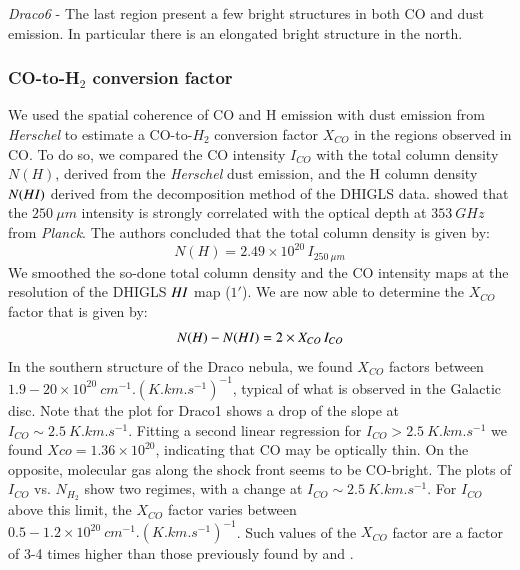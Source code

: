 \documentclass[traditabstract]{aa}
\begin{document}
\noindent \textit{Draco6} - The last region present a few bright structures in both CO and dust emission. In particular there is an elongated bright structure in the north.


      \subsubsection{CO-to-H$_2$ conversion factor}

   We used the spatial coherence of CO and H emission with dust emission from \emph{Herschel} to estimate a CO-to-$H_2$ conversion factor $X_{CO}$ in the regions observed in CO. To do so, we compared the CO intensity $I_{CO}$ with the total column density $N(H)$, derived from the \emph{Herschel} dust emission, and the H column density $N(H\rmnum{1})$ derived from the decomposition method of the DHIGLS data. \cite{MAMD_2017b} showed that the $250\: \mu m$ intensity is strongly correlated with the optical depth at $353\: GHz$ from \emph{Planck}. The authors concluded that the total column density is given by:
\begin{equation}
  N(H)=2.49\times 10^{20}\, I_{250\: \mu m}
\end{equation}
We smoothed the so-done total column density and the CO intensity maps at the resolution of the DHIGLS $H\rmnum{1}$ map ($1'$). We are now able to determine the $X_{CO}$ factor that is given by:
\begin{equation}
  N(H)-N(H\rmnum{1})=2\times X_{CO}\, I_{CO}
\end{equation}
In the southern structure of the Draco nebula, we found $X_{CO}$ factors between $1.9-20\times 10^{20}\: cm^{-1}.(K.km.s^{-1})^{-1}$, typical of what is observed in the Galactic disc\citep{Bolatto_2013}. Note that the plot for Draco1 shows a drop of the slope at $I_{CO}\sim 2.5\: K.km.s^{-1}$. Fitting a second linear regression for $I_{CO}>2.5\: K.km.s^{-1}$ we found $Xco=1.36\times 10^{20}$, indicating that CO may be optically thin.
On the opposite, molecular gas along the shock front seems to be CO-bright. The plots of $I_{CO}$ vs. $N_{H_2}$ show two regimes, with a change at $I_{CO}\sim 2.5\: K.km.s^{-1}$. For $I_{CO}$ above this limit, the $X_{CO}$ factor varies between $0.5-1.2\times 10^{20}\: cm^{-1}.(K.km.s^{-1})^{-1}$.
Such values of the $X_{CO}$ factor are a factor of 3-4 times higher than those previously found by \cite{Herbstmeier_1993} and \cite{Moritz_1998}.
\end{document}
